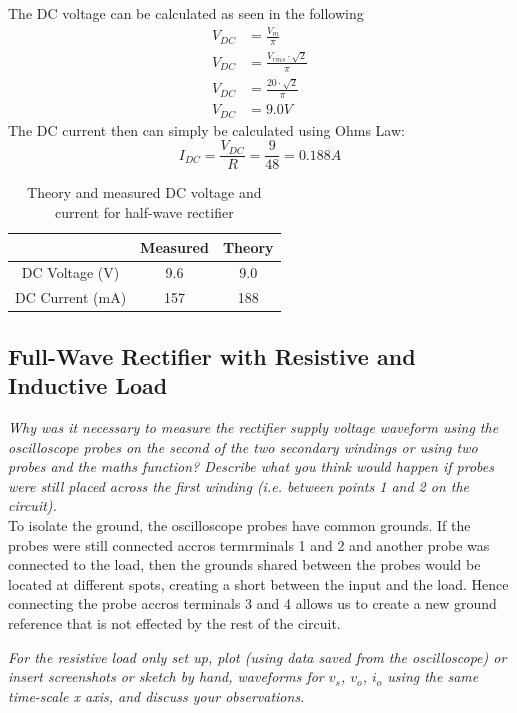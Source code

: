 \documentclass[12pt,a4paper]{article}
\begin{document}
The DC voltage can be calculated as seen in the following
\begin{align*}
V_{DC} &= \frac{V_m}{\pi} \\
V_{DC} &= \frac{V_{rms}\cdot\sqrt{2}}{\pi} \\
V_{DC} &= \frac{20\cdot\sqrt{2}}{\pi} \\
V_{DC} &= 9.0V
\end{align*}
The DC current then can simply be calculated using Ohms Law:
\[I_{DC} = \frac{V_{DC}}{R} = \frac{9}{48} = 0.188A\]

\begin{table}[H]
\caption{Theory and measured DC voltage and current for half-wave rectifier \label{tab:table1}}
\centering
\begin{tabular}{|c|c|c|}
\hline
 & Measured & Theory\\
\hline
DC Voltage (V) & 9.6 & 9.0\\
\hline
DC Current (mA) & 157 & 188\\
\hline
\end{tabular}
\end{table}

\subsection{Full-Wave Rectifier with Resistive and Inductive Load}
\textit{Why was it necessary to measure the rectifier supply voltage waveform using the oscilloscope
probes on the second of the two secondary windings or using two probes and the maths function?
Describe what you think would happen if probes were still placed across the first winding (i.e.
between points 1 and 2 on the circuit).}\\

To isolate the ground, the oscilloscope probes have common grounds. If the probes were still connected accros termrminals 1 and 2 and another probe was connected to the load, then the grounds shared between the probes would be located at different spots, creating a short between the input and the load. Hence connecting the probe accros terminals 3 and 4 allows us to create a new ground reference that is not effected by the rest of the circuit.

\textit{For the resistive load only set up, plot (using data saved from the oscilloscope) or insert screenshots
or sketch by hand, waveforms for $v_s$, $v_o$, $i_o$ using the same time-scale x axis, and discuss your
observations.}\\
\end{document}
